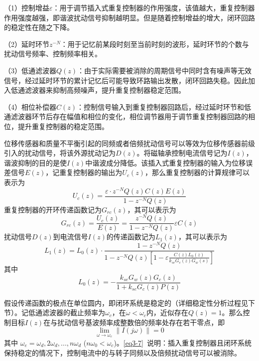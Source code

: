 \documentclass[
  lang=cn,
  degree=master,
  openany,oneside
]{nuaathesis}
\begin{document}
（1）控制增益$\varepsilon $：用于调节插入式重复控制器的作用强度，该值越大，重复控制器作用强度越强，即谐波扰动信号抑制越明显。但是随着控制增益的增大，闭环回路的稳定性在随之下降。

（2）延时环节${z^{ - N}}$：用于记忆前某段时刻至当前时刻的波形，延时环节的个数与扰动信号频率、控制频率相关。

（3）低通滤波器$Q(z)$：由于实际需要被消除的周期信号中同时含有噪声等无效信号，经过延时环节的累计记忆后可能导致环路输出发散，闭环回路失稳。因此加入低通滤波器来抑制高频噪声，提升重复控制器稳定范围。

（4）相位补偿器$C(z)$：控制信号输入到重复控制器回路后，经过延时环节和低通滤波器环节后存在幅值和相位的变化，相位调节器用于调节重复控制器回路的相位，提升重复控制器的稳定范围。

位移传感器和质量不平衡引起的同频或者倍频扰动信号可以等效为位移传感器前级引入的扰动信号，将该外源扰动记为$D(z)$。将磁轴承控制电流信号记为$I(z)$，谐波抑制的目的是使$I(z)$中谐波成分降低。该插入式重复控制器的输入为位移误差信号$E(z)$，记重复控制器的输出为$U_c(z)$，那么重复控制器的计算规律可以表示为
\begin{equation}
{U_c}\left( z \right) = \frac{{\varepsilon  \cdot {z^{ - N}}Q\left( z \right)C\left( z \right)E\left( z \right)}}{{1 - {z^{ - N}}Q\left( z \right)}}
\label{eq3-3}
\end{equation}
重复控制器的开环传递函数记为$G_{rc}(z)$，其可以表示为
\begin{equation}
{G_{rc}}\left( z \right) = \frac{{{U_c}\left( z \right)}}{{E\left( z \right)}} = \frac{{{z^{ - N}}Q\left( z \right)}}{{1 - {z^{ - N}}Q\left( z \right)}}\varepsilon C\left( z \right)
\label{eq3-4}
\end{equation}
扰动信号$D(z)$到电流信号$I(z)$的传递函数记为$L_1(z)$，其可以表示为
\begin{equation}
{L_1}\left( z \right) = {L_0}\left( z \right) \cdot \frac{{1 - {z^{ - N}}Q\left( z \right)}}{{1 - {z^{ - N}}Q\left( z \right)\left[ {1 - \varepsilon \frac{{C\left( z \right){L_0}\left( z \right)}}{{{k_{se}}{G_c}\left( z \right){G_w}\left( s \right)}}} \right]}}
\label{eq3-5}
\end{equation}
其中
\begin{equation}
{L_0}\left( z \right) =  - \frac{{{k_{se}}{G_w}\left( z \right){G_c}\left( z \right)}}{{1 + {k_{se}}{G_c}\left( z \right)P\left( z \right)}}
\label{eq3-6}
\end{equation}

假设传递函数的极点在单位圆内，即闭环系统是稳定的（详细稳定性分析过程见下节）。记低通滤波器的截止频率为$\omega_c $，在$\omega<\omega_c$内，近似存在$Q(z)=1$。那么控制目标$I(z)$在与扰动信号基波频率成整数倍的频率处存在若干零点，即
\begin{equation}
\label{eq3-7}
\mathop {\lim }\limits_{\omega  \to {\omega _e}} \left\| {I\left( {j\omega } \right)} \right\| = 0
\end{equation}
其中 $\omega _e=\omega _d, 2\omega _d,...,n\omega _d$ ($n\omega _0$$<$$\omega _c$)。\autoref{eq3-7}~说明：插入重复控制器且闭环系统保持稳定的情况下，控制电流中的与转子同频以及倍频扰动信号可以被消除。
\end{document}
